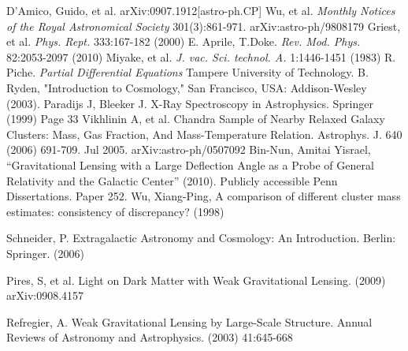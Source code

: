 \documentclass[a4paper,12pt]{article}
\begin{document}
{\begin{thebibliography}{1}
 D'Amico, Guido, et al. arXiv:0907.1912[astro-ph.CP] 
 Wu, et al.  \emph{Monthly Notices of the Royal Astronomical Society} 301(3):861-971.  arXiv:astro-ph/9808179
 Griest, et al.  \emph{Phys. Rept.} 333:167-182 (2000) 
 E. Aprile, T.Doke. \emph{Rev. Mod. Phys.} 82:2053-2097 (2010)
 Miyake, et al.  \emph{J. vac. Sci. technol. A.} 1:1446-1451 (1983)
 R. Piche. \emph{Partial Differential Equations} Tampere University of Technology.
 B. Ryden, "Introduction to Cosmology," San Francisco, USA: Addison-Wesley (2003).
 Paradijs J, Bleeker J. X-Ray Spectroscopy in Astrophysics. Springer (1999) Page 33
Vikhlinin A, et al. Chandra Sample of Nearby Relaxed Galaxy Clusters: Mass, Gas Fraction, And Mass-Temperature Relation.  Astrophys. J. 640 (2006) 691-709. Jul 2005. arXiv:astro-ph/0507092
 Bin-Nun, Amitai Yisrael, “Gravitational Lensing with a Large Deflection Angle as a Probe of General Relativity and the Galactic Center” (2010). Publicly accessible Penn Dissertations. Paper 252.
 Wu, Xiang-Ping, A comparison of different cluster mass estimates: consistency of discrepancy? (1998)


 Schneider, P. Extragalactic Astronomy and Cosmology: An Introduction. Berlin: Springer. (2006)

 Pires, S, et al.  Light on Dark Matter with Weak Gravitational Lensing. (2009)  	arXiv:0908.4157



 Refregier, A. Weak Gravitational Lensing by Large-Scale Structure.  Annual Reviews of Astronomy and Astrophysics.  (2003) 41:645-668


\end{thebibliography}}
\end{document}
